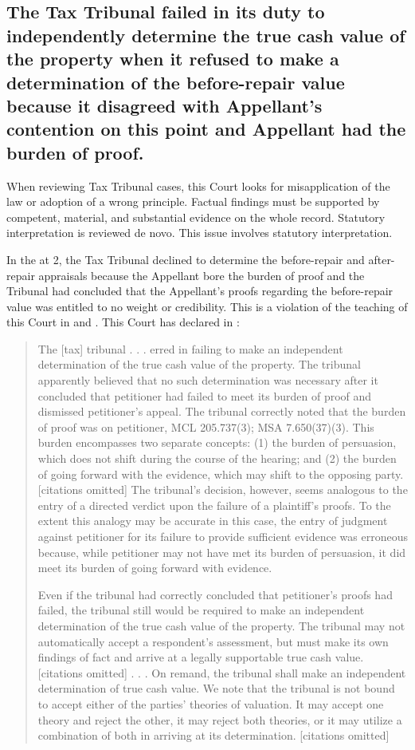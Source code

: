 \documentclass[12pt,\documentclassflag]{michiganCourtOfAppealsBrief}
\begin{document}
\subsection{The Tax Tribunal failed in its duty to independently determine the true cash value of the property when it refused to make a determination of the before-repair value because it disagreed with Appellant's contention on this point and Appellant had the burden of proof.
}

When reviewing Tax Tribunal cases, this Court looks for misapplication of the law or adoption of a wrong principle. Factual findings must be supported by competent, material, and substantial evidence on the whole record. Statutory interpretation is reviewed de novo.  This issue involves statutory interpretation.

In the \orderDenying at 2, the Tax Tribunal declined to determine the before-repair and after-repair appraisals because the Appellant bore the burden of proof and the Tribunal had concluded that the Appellant's proofs regarding the before-repair value was entitled to no weight or credibility.  This is a violation of the teaching of this Court in \cite{Jones & Laughlin} and \cite{Fisher}. This Court has declared in :

\begin{quotation}
	The [tax] tribunal . . . erred in failing to make an independent determination of the true cash value of the property. The tribunal apparently believed that no such determination was necessary after it concluded that petitioner had failed to meet its burden of proof and dismissed petitioner's appeal. The tribunal correctly noted that the burden of proof was on petitioner, MCL 205.737(3); MSA 7.650(37)(3). This burden encompasses two separate concepts: (1) the burden of persuasion, which does not shift during the course of the hearing; and (2) the burden of going forward with the evidence, which may shift to the opposing party. [citations omitted] The tribunal's decision, however, seems analogous to the entry of a directed verdict upon the failure of a plaintiff's proofs. To the extent this analogy may be accurate in this case, the entry of judgment against petitioner for its failure to provide sufficient evidence was erroneous because, while petitioner may not have met its burden of persuasion, it did meet its burden of going forward with evidence.
	
	Even if the tribunal had correctly concluded that petitioner's proofs had failed, the tribunal still would be required to make an independent determination of the true cash value of the property. The tribunal may not automatically accept a respondent's assessment, but must make its own findings of fact and arrive at a legally supportable true cash value. [citations omitted] . . . On remand, the tribunal shall make an independent determination of true cash value. We note that the tribunal is not bound to accept either of the parties' theories of valuation. It may accept one theory and reject the other, it may reject both theories, or it may utilize a combination of both in arriving at its determination. [citations omitted]
\end{quotation}
\end{document}
